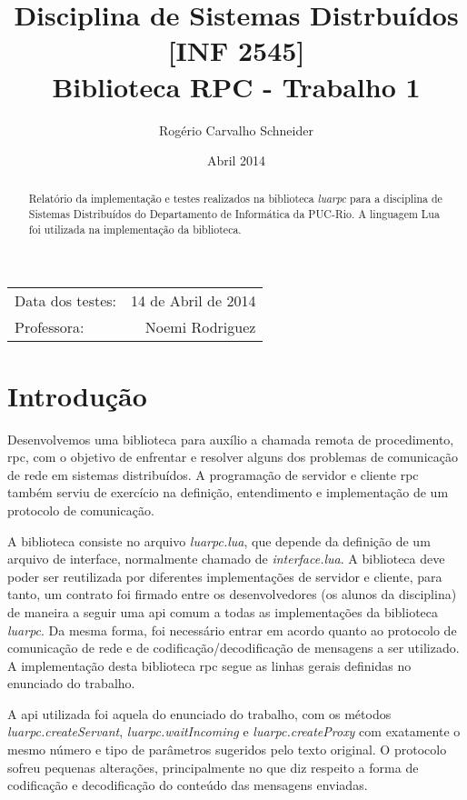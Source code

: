 \documentclass[11pt]{article}
\begin{document}
\title{Disciplina de Sistemas Distrbuídos [INF 2545] \\ Biblioteca RPC -
Trabalho 1}
\author{Rogério Carvalho Schneider}
\date{Abril 2014}
\maketitle

\begin{center}
\begin{tabular}{l r}
Data dos testes: & 14 de Abril de 2014 \\
Professora: & Noemi Rodriguez
\end{tabular}
\end{center}

\begin{abstract}
Relatório da implementação e testes realizados na biblioteca \textit{luarpc}
para a disciplina de Sistemas Distribuídos do Departamento de Informática da PUC-Rio.
A linguagem Lua foi utilizada na implementação da biblioteca.
\end{abstract}

\doublespacing

\section{Introdução}\label{sec:introduction}

Desenvolvemos uma biblioteca para auxílio a chamada remota de
procedimento, \gls{rpc}, com o objetivo de enfrentar e resolver alguns dos problemas
de comunicação de rede em sistemas distribuídos. A programação de servidor e
cliente \gls{rpc} também serviu de exercício na definição, entendimento e
implementação de um protocolo de comunicação.

A biblioteca consiste no arquivo \textit{luarpc.lua}, que depende da
definição de um arquivo de interface, normalmente chamado de
\textit{interface.lua}. A biblioteca deve poder ser reutilizada por diferentes
implementações de servidor e cliente, para tanto, um contrato foi firmado entre
os desenvolvedores (os alunos da disciplina) de maneira a seguir uma \gls{api}
comum a todas as implementações da biblioteca \textit{luarpc}. Da mesma forma,
foi necessário entrar em acordo quanto ao protocolo de comunicação de rede e de
codificação/decodificação de mensagens a ser utilizado. A implementação desta
biblioteca \gls{rpc} segue as linhas gerais definidas no enunciado do trabalho\cite{trab1}.

A \gls{api} utilizada foi aquela do enunciado do trabalho, com os métodos
\textit{luarpc.createServant}, \textit{luarpc.waitIncoming} e
\textit{luarpc.createProxy} com exatamente o mesmo número e tipo de parâmetros
sugeridos pelo texto original. O protocolo sofreu pequenas alterações,
principalmente no que diz respeito a forma de codificação e decodificação do
conteúdo das mensagens enviadas.
\end{document}
